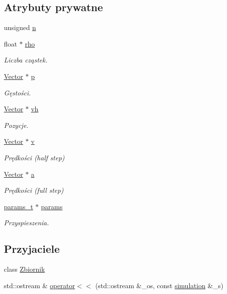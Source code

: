 \subsection*{Atrybuty prywatne}
\begin{DoxyCompactItemize}
\item 
unsigned \hyperlink{classsimulation_a22eb97765a5c60adf3d995f7a110da70}{n}
\item 
float $\ast$ \hyperlink{classsimulation_a44081d4edd92e17a3e1067b976031a00}{rho}
\begin{DoxyCompactList}\small\item\em Liczba cząstek. \end{DoxyCompactList}\item 
\hyperlink{class_vector}{Vector} $\ast$ \hyperlink{classsimulation_a5412fd01febe99f12ae38e30eb692ff0}{p}
\begin{DoxyCompactList}\small\item\em Gęstości. \end{DoxyCompactList}\item 
\hyperlink{class_vector}{Vector} $\ast$ \hyperlink{classsimulation_ae6da1f15728f49be7b0793700866ede9}{vh}
\begin{DoxyCompactList}\small\item\em Pozycje. \end{DoxyCompactList}\item 
\hyperlink{class_vector}{Vector} $\ast$ \hyperlink{classsimulation_a39dbad79b1b8667840638a35e839a3f7}{v}
\begin{DoxyCompactList}\small\item\em Prędkości (half step) \end{DoxyCompactList}\item 
\hyperlink{class_vector}{Vector} $\ast$ \hyperlink{classsimulation_a7b5ca0e5fc096989be7966a73c360b7f}{a}
\begin{DoxyCompactList}\small\item\em Prędkości (full step) \end{DoxyCompactList}\item 
\hyperlink{structparams__t}{params\-\_\-t} $\ast$ \hyperlink{classsimulation_a861b82cc3c0e7e58abfba464a133dae3}{params}
\begin{DoxyCompactList}\small\item\em Przyspieszenia. \end{DoxyCompactList}\end{DoxyCompactItemize}
\subsection*{Przyjaciele}
\begin{DoxyCompactItemize}
\item 
class \hyperlink{classsimulation_a444a8643309d19294860a4ae144137fe}{Zbiornik}
\item 
std\-::ostream \& \hyperlink{classsimulation_a1f6414b078a2823f5cea77fc1235e1d9}{operator$<$$<$} (std\-::ostream \&\-\_\-os, const \hyperlink{classsimulation}{simulation} \&\-\_\-s)
\end{DoxyCompactItemize}


